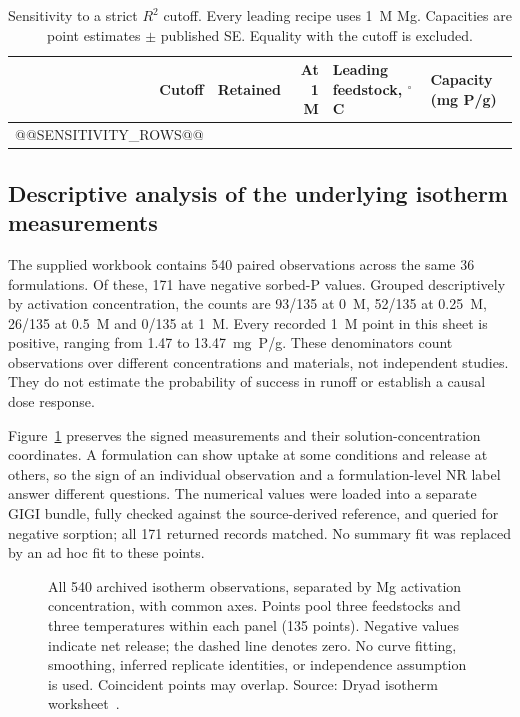 \documentclass[11pt,letterpaper]{article}
\begin{document}
\begin{table}[htbp]
\centering\small
\caption{Sensitivity to a strict $R^2$ cutoff. Every leading recipe uses 1~M Mg. Capacities are point estimates $\pm$ published SE. Equality with the cutoff is excluded.}
\label{tab:sensitivity}
\begin{tabular}{@{}rrrll@{}}
\toprule
Cutoff & Retained & At 1 M & Leading feedstock, $^\circ$C & Capacity (mg P/g)\\
\midrule
@@SENSITIVITY_ROWS@@
\bottomrule
\end{tabular}
\end{table}

\subsection{Descriptive analysis of the underlying isotherm measurements}
The supplied workbook contains 540 paired observations across the same 36 formulations. Of these, 171 have negative sorbed-P values. Grouped descriptively by activation concentration, the counts are 93/135 at 0~M, 52/135 at 0.25~M, 26/135 at 0.5~M and 0/135 at 1~M. Every recorded 1~M point in this sheet is positive, ranging from 1.47 to 13.47~mg~P/g. These denominators count observations over different concentrations and materials, not independent studies. They do not estimate the probability of success in runoff or establish a causal dose response.

Figure~\ref{fig:raw} preserves the signed measurements and their solution-concentration coordinates. A formulation can show uptake at some conditions and release at others, so the sign of an individual observation and a formulation-level NR label answer different questions. The numerical values were loaded into a separate GIGI bundle, fully checked against the source-derived reference, and queried for negative sorption; all 171 returned records matched. No summary fit was replaced by an ad hoc fit to these points.

\begin{figure}[p]
\centering
{}
\caption{All 540 archived isotherm observations, separated by Mg activation concentration, with common axes. Points pool three feedstocks and three temperatures within each panel (135 points). Negative values indicate net release; the dashed line denotes zero. No curve fitting, smoothing, inferred replicate identities, or independence assumption is used. Coincident points may overlap. Source: Dryad isotherm worksheet~\cite{dryad}.}
\label{fig:raw}
\end{figure}
\end{document}
